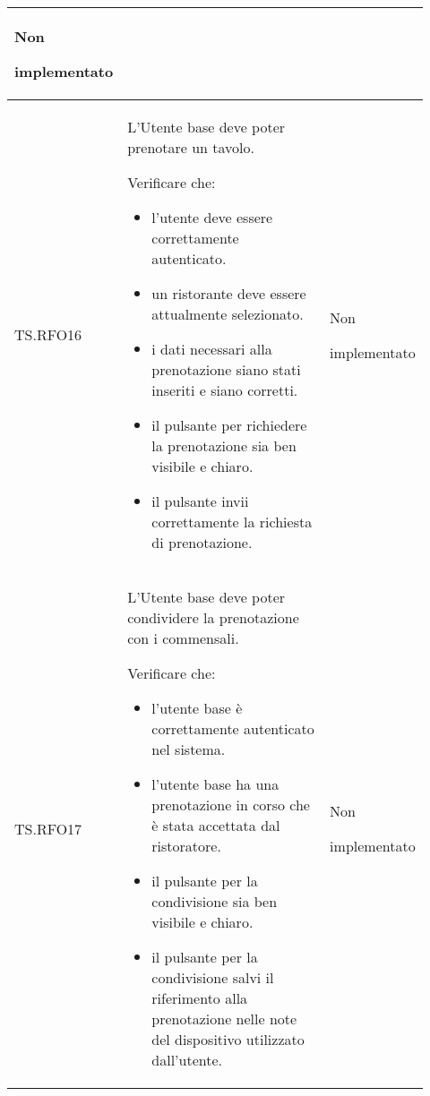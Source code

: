 \begin{longtable}{|p{0.10\linewidth}|p{0.70\linewidth}|p{0.12\linewidth}|}
	Non \par implementato                                                                                                                                                   \\
	\hline
	TS.RFO16                                                                                                                        &
	L’Utente base deve poter prenotare un tavolo.  \par
	Verificare che:
	\begin{itemize}
		\item l'utente deve essere correttamente autenticato.
		\item un ristorante deve essere attualmente selezionato.
		\item i dati necessari alla prenotazione siano stati inseriti e siano corretti.
		\item il pulsante per richiedere la prenotazione sia ben visibile e chiaro.
		\item il pulsante invii correttamente la richiesta di prenotazione.
	\end{itemize}                                                 &
	Non \par implementato                                                                                                                                                   \\
	\hline
	TS.RFO17                                                                                                                        &
	L’Utente base deve poter condividere la prenotazione con i commensali\g.  \par
	Verificare che:
	\begin{itemize}
		\item l'utente base è correttamente autenticato nel sistema.
		\item l'utente base ha una prenotazione in corso che è stata accettata dal ristoratore.
		\item il pulsante per la condivisione sia ben visibile e chiaro.
		\item il pulsante per la condivisione salvi il riferimento alla prenotazione nelle note del dispositivo utilizzato dall'utente.
	\end{itemize} &
	Non \par implementato                                                                                                                                                   \\

\end{longtable}
